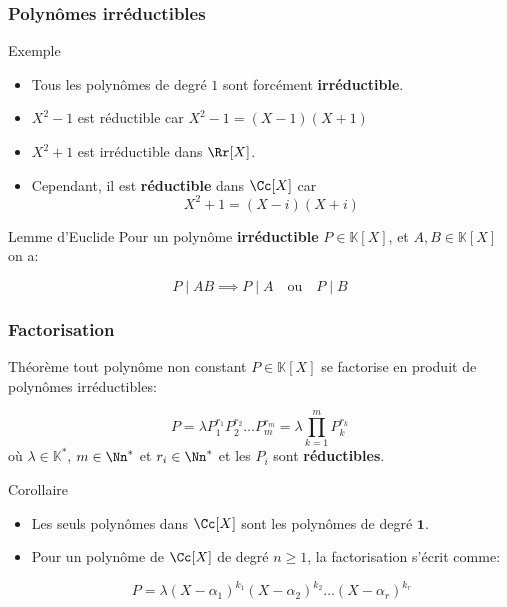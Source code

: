 \documentclass{beamer}
\newcommand{\setK}{\mathbb{K}}
\begin{document}
\begin{frame}[<+->]
  \frametitle{Polynômes irréductibles}
 \begin{block}{Exemple}
   \begin{itemize}
     \small
   \item Tous les polynômes de degré $1$ sont forcément
     \textbf{\textbf{irréductible}}.\\[4pt]
   \item $X^2-1$ est réductible car $X^2-1 = (X-1)(X+1)$\\[4pt]
   \item $X^2 +1$ est irréductible dans $\Rr[X]$.
   \item Cependant, il est \textbf{\alert{réductible}} dans $\Cc[X]$ car 
     \begin{equation}
       X^2 + 1 = (X- i)(X+i)
     \end{equation}
   \end{itemize}
 \end{block} 
 \pause

 \begin{block}{Lemme d'Euclide}
   Pour un polynôme \textbf{\alert{irréductible}} $P\in\setK[X]$, et $A,B\in
   \setK[X]$ on a:

   \begin{equation}
     P\;|\;AB \implies P\;|\; A\quad \text{ou}\quad P\;|\; B
   \end{equation}
 \end{block}
\end{frame}
\begin{frame}[<+->]
  \frametitle{Factorisation}
 
  \begin{block}{Théorème}
    tout polynôme non constant $P\in \setK[X]$ se factorise en produit de
    polynômes irréductibles:

    \begin{equation}
      P =\lambda P_1^{r_1}P_2^{r_2}\ldots P_m^{r_m} =\lambda \prod_{k=1}^{m} P_k^{r_k}
    \end{equation}
    où $\lambda \in \setK^{*}$, $m\in\Nn^{*}$ et $r_i\in \Nn^{
    *}$ et les $P_i$ sont \textbf{\alert{réductibles}}.
  \end{block}
  \pause
  \begin{block}{Corollaire}
    
    \begin{itemize}
      \item Les seuls polynômes dans $\Cc[X]$ sont les polynômes de degré
        $\mathbf{1}$.\\[4pt]
      \item Pour un polynôme de $\Cc[X]$ de degré $n\geq 1$, la factorisation
        s'écrit comme:

        \begin{equation}
          P=\lambda (X-\alpha_1)^{k_1}(X-\alpha_2)^{k_2}\ldots(X-\alpha_r)^{k_r}
        \end{equation}
    \end{itemize}
  \end{block}
\end{frame}
\end{document}
